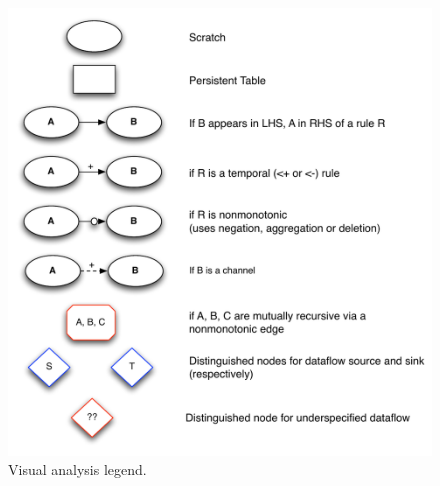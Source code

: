 \begin{figure}[t]
\centering
\includegraphics[width=1.1\linewidth]{fig/mittalk_legend.pdf}
\vspace{-10pt}
\caption{Visual analysis legend.}
\label{fig:analysis-legend}
\vspace{-2pt}
\end{figure}



















